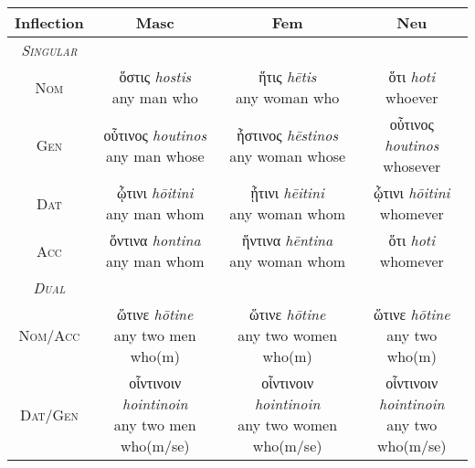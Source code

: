 \documentclass[10pt]{memoir}
\newcommand{\tsc}[1]{\textsc{#1}}
\newcommand{\grc}[1]{\fontspec{Inter}#1}
\newcommand{\trc}[1]{\textit{\fontspec{Tinos}#1}}
\begin{document}
    \begin{table}[H]
        \begin{tabular}{c|ccc}
            \textbf{Inflection} & \textbf{Masc} & \textbf{Fem} & \textbf{Neu} \\
            \hline
            \emph{\tsc{Singular}} \\
            \tsc{Nom} & \makecell{\grc{ὅστις} \trc{hostis} \\ \small any man who} & \makecell{\grc{ἥτις} \trc{hētis} \\ \small any woman who } & \makecell{\grc{ὅτι} \trc{hoti} \\ \small whoever} \\
            \tsc{Gen} & \makecell{\grc{οὗτινος} \trc{houtinos} \\ \small any man whose} & \makecell{\grc{ἧστινος} \trc{hēstinos} \\ \small any woman whose} & \makecell{\grc{οὗτινος} \trc{houtinos} \\ \small whosever } \\
            \tsc{Dat} & \makecell{\grc{ᾧτινι} \trc{hōitini} \\ \small any man whom } & \makecell{\grc{ᾗτινι} \trc{hēitini} \\ \small any woman whom} & \makecell{\grc{ᾧτινι} \trc{hōitini} \\ \small whomever} \\
            \tsc{Acc} & \makecell{\grc{ὅντινα} \trc{hontina} \\ \small any man whom} & \makecell{\grc{ἥντινα} \trc{hēntina} \\ \small any woman whom} & \makecell{\grc{ὅτι} \trc{hoti} \\ \small whomever} \\
            \hline
            \emph{\tsc{Dual}} \\
            \tsc{Nom/Acc} & \makecell{\grc{ὥτινε} \trc{hōtine} \\ \small any two men who(m)} & \makecell{\grc{ὥτινε} \trc{hōtine} \\ \small any two women who(m)} & \makecell{\grc{ὥτινε} \trc{hōtine} \\ \small any two who(m)} \\
            \tsc{Dat/Gen} & \makecell{\grc{οἷντινοιν} \trc{hointinoin} \\ \small any two men who(m/se)} & \makecell{\grc{οἷντινοιν} \trc{hointinoin} \\ \small any two women who(m/se)} & \makecell{\grc{οἷντινοιν} \trc{hointinoin} \\ \small any two who(m/se)} \\

\end{tabular}
\end{table}
\end{document}
